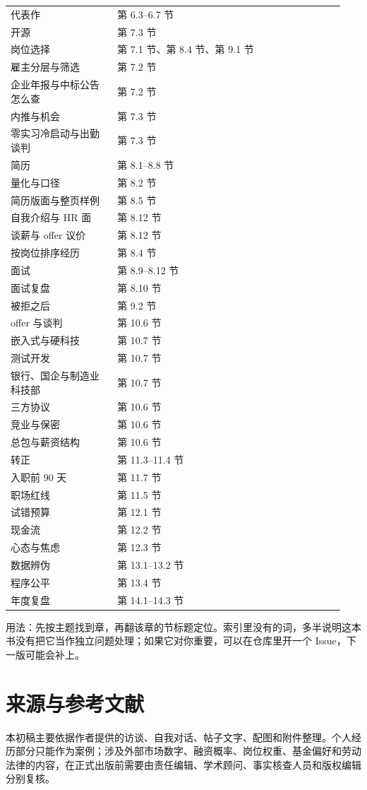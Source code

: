 \documentclass[UTF8,zihao=5,openany]{ctexbook}
\begin{document}
{\begin{longtable}{p{0.30\linewidth}p{0.64\linewidth}}
代表作 & 第 6.3–6.7 节 \\
开源 & 第 7.3 节 \\
岗位选择 & 第 7.1 节、第 8.4 节、第 9.1 节 \\
雇主分层与筛选 & 第 7.2 节 \\
企业年报与中标公告怎么查 & 第 7.2 节 \\
内推与机会 & 第 7.3 节 \\
零实习冷启动与出勤谈判 & 第 7.3 节 \\
简历 & 第 8.1–8.8 节 \\
量化与口径 & 第 8.2 节 \\
简历版面与整页样例 & 第 8.5 节 \\
自我介绍与 HR 面 & 第 8.12 节 \\
谈薪与 offer 议价 & 第 8.12 节 \\
按岗位排序经历 & 第 8.4 节 \\
面试 & 第 8.9–8.12 节 \\
面试复盘 & 第 8.10 节 \\
被拒之后 & 第 9.2 节 \\
offer 与谈判 & 第 10.6 节 \\
嵌入式与硬科技 & 第 10.7 节 \\
测试开发 & 第 10.7 节 \\
银行、国企与制造业科技部 & 第 10.7 节 \\
三方协议 & 第 10.6 节 \\
竞业与保密 & 第 10.6 节 \\
总包与薪资结构 & 第 10.6 节 \\
转正 & 第 11.3–11.4 节 \\
入职前 90 天 & 第 11.7 节 \\
职场红线 & 第 11.5 节 \\
试错预算 & 第 12.1 节 \\
现金流 & 第 12.2 节 \\
心态与焦虑 & 第 12.3 节 \\
数据辨伪 & 第 13.1–13.2 节 \\
程序公平 & 第 13.4 节 \\
年度复盘 & 第 14.1–14.3 节 \\
\bottomrule
\end{longtable}}

用法：先按主题找到章，再翻该章的节标题定位。索引里没有的词，多半说明这本书没有把它当作独立问题处理；如果它对你重要，可以在仓库里开一个 Issue，下一版可能会补上。

\chapter{来源与参考文献}
本初稿主要依据作者提供的访谈、自我对话、帖子文字、配图和附件整理。个人经历部分只能作为案例；涉及外部市场数字、融资概率、岗位权重、基金偏好和劳动法律的内容，在正式出版前需要由责任编辑、学术顾问、事实核查人员和版权编辑分别复核。
\end{document}
